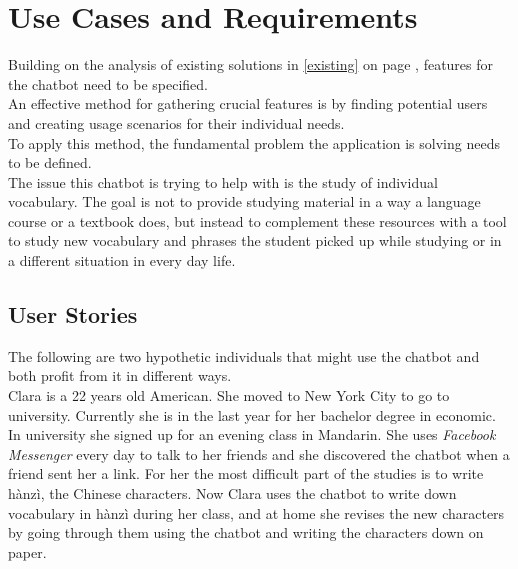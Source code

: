 \section{Use Cases and Requirements}


Building on the analysis of existing solutions in \ref{existing} on page \pageref{existing}, features for the chatbot need to be specified.
\\
An effective method for gathering crucial features is by finding potential users
and creating usage scenarios for their individual needs.
\\

To apply this method, the fundamental problem the application is solving needs to be defined.
\\

The issue this chatbot is trying to help with is the study of individual vocabulary.
The goal is not to provide studying material in a way a language course or a textbook does,
but instead to complement these resources with a tool to study new vocabulary and phrases the student picked up
while studying or in a different situation in every day life.
\\


\subsection{User Stories}

The following are two hypothetic individuals that might use the chatbot and both profit from it in different ways.
\\

Clara is a 22 years old American.
She moved to New York City to go to university.
Currently she is in the last year for her bachelor degree in economic.
In university she signed up for an evening class in Mandarin.
She uses \emph{Facebook Messenger} every day to talk to her friends and she discovered the chatbot when a friend sent her a link.
For her the most difficult part of the studies is to write hànzì, the Chinese characters.
Now Clara uses the chatbot to write down vocabulary in hànzì during her class,
and at home she revises the new characters by going through them using the chatbot and writing the characters
down on paper.
\\

